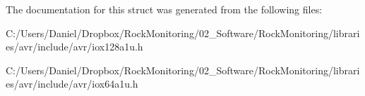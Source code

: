 The documentation for this struct was generated from the following files\+:\begin{DoxyCompactItemize}
\item 
C\+:/\+Users/\+Daniel/\+Dropbox/\+Rock\+Monitoring/02\+\_\+\+Software/\+Rock\+Monitoring/libraries/avr/include/avr/iox128a1u.\+h\item 
C\+:/\+Users/\+Daniel/\+Dropbox/\+Rock\+Monitoring/02\+\_\+\+Software/\+Rock\+Monitoring/libraries/avr/include/avr/iox64a1u.\+h\end{DoxyCompactItemize}
